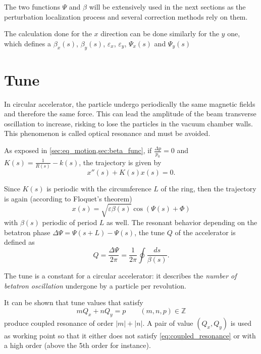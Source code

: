 The two functions $\Psi$ and $\beta$ will be extensively used in the next sections as the perturbation localization process and several correction methods rely on them.

\remark The calculation done for the $x$ direction can be done similarly for the $y$ one, which defines a $\beta_x(s)$, $\beta_y(s)$, $\varepsilon_x$, $\varepsilon_y$, $\Psi_x(s)$ and $\Psi_y(s)$

\section{Tune}
In circular accelerator, the particle undergo periodically the same magnetic fields and therefore the same force. This can lead the amplitude of the beam transverse oscillation to increase, risking to lose the particles in the vacuum chamber walls. This phenomenon is called optical resonance and must be avoided.

As exposed in \cref{sec:eq_motion,sec:beta_func}, if $\frac{\Delta p}{p_0} = 0$ and $K(s)=\frac{1}{R(s)}-k(s)$, the trajectory is given by
\begin{equation}
x''(s)+K(s) x(s) = 0.
\end{equation}

Since $K(s)$ is periodic with the circumference $L$ of the ring, then the trajectory is again (according to Floquet's theorem)
\begin{equation}
x(s) = \sqrt{\varepsilon \beta(s)} \cos\left(\Psi(s)+\Phi\right)
\end{equation}
with $\beta(s)$ periodic of period $L$ as well. The resonant behavior depending on the betatron phase $\Delta \Psi = \Psi(s+L)-\Psi(s)$, the tune $Q$ of the accelerator is defined as
\begin{equation}
\label{eq:tune}
Q = \frac{\Delta \Psi}{2 \pi} = \frac{1}{2 \pi} \oint\frac{ds}{\beta(s)}.
\end{equation}

The tune is a constant for a circular accelerator: it describes the \emph{number of betatron oscillation} undergone by a particle per revolution.

It can be shown that tune values that satisfy
\begin{equation}
\label{eq:coupled_resonance}
m Q_x + n Q_y = p \qquad (m, n, p) \in \mathbb{Z}
\end{equation}
produce coupled resonance of order $|m|+|n|$. A pair of value $(Q_x,Q_y)$ is used as working point so that it either does not satisfy \cref{eq:coupled_resonance} or with a high order (above the 5th order for instance).

